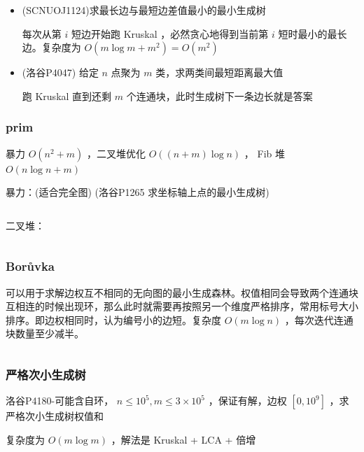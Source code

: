 \documentclass[twocolumn,10pt]{ctexart}
\begin{document}
\begin{itemize}
\item (SCNUOJ1124)求最长边与最短边差值最小的最小生成树

每次从第 $i$ 短边开始跑 Kruskal ，必然贪心地得到当前第 $i$ 短时最小的最长边。复杂度为 $O(m\log m+m^2)=O(m^2)$
\end{itemize}

\begin{itemize}
\item (洛谷P4047) 给定 $n$ 点聚为 $m$ 类，求两类间最短距离最大值

跑 Kruskal 直到还剩 $m$ 个连通块，此时生成树下一条边长就是答案
\end{itemize}

\subsubsection{prim}

暴力 $O(n^2+m)$ ，二叉堆优化 $O((n+m)\log n)$ ， Fib 堆 $O(n\log n+m)$

暴力：(适合完全图) (洛谷P1265 求坐标轴上点的最小生成树)

\inputminted{cpp}{code/p1265_prim.cpp}

二叉堆：

\inputminted{cpp}{code/ext_043.cpp}

\subsubsection{Borůvka}

可以用于求解边权互不相同的无向图的最小生成森林。权值相同会导致两个连通块互相连的时候出现环，那么此时就需要再按照另一个维度严格排序，常用标号大小排序。即边权相同时，认为编号小的边短。复杂度 $O(m\log n)$ ，每次迭代连通块数量至少减半。

\inputminted{cpp}{code/p3366_Boruvka.cpp}

\subsubsection{严格次小生成树}

\begin{notebox}
洛谷P4180-可能含自环， $n\le10^5,m\le3\times10^5$ ，保证有解，边权 $[0,10^9]$ ，求严格次小生成树权值和
\end{notebox}

复杂度为 $O(m\log m)$ ，解法是 Kruskal + LCA + 倍增

\inputminted{cpp}{code/p4180_less_mst.cpp}
\end{document}
